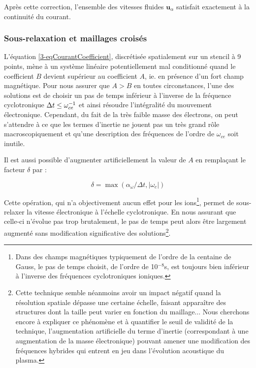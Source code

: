 \begin{refsection}
Après cette correction, l'ensemble des vitesses fluides $\mathbf u_\alpha$
satisfait exactement à la continuité du courant. 

\subsubsection{Sous-relaxation et maillages croisés}
L'équation \eqref{3-eqCourantCoefficient}, discrétisée spatialement sur un
stencil à 9 points, mène à un système linéaire potentiellement mal conditionné
quand le coefficient $B$ devient supérieur au coefficient $A$, ie. en présence
d'un fort champ magnétique. Pour nous assurer que $A>B$ en toutes circonstances,
l'une des solutions est de choisir un pas de temps inférieur à l'inverse de la
fréquence cyclotronique $\Delta t\leq\omega_{ce}^{{-1}}$ et
ainsi résoudre l'intégralité du mouvement électronique. Cependant, du fait de la
très faible masse des électrons, on peut s'attendre à ce que les termes
d'inertie ne jouent pas un très grand rôle macroscopiquement et qu'une
description des fréquences de l'ordre de $\omega_{ce}$ soit inutile.

Il est aussi possible d'augmenter artificiellement la valeur de $A$ en
remplaçant le facteur $\delta$ par :

\begin{equation*}
\delta=\max(\alpha_\omega/\Delta t,|\omega_c|)
\end{equation*}

Cette opération, qui n'a objectivement aucun effet pour les
ions\footnote{Dans des champs magnétiques typiquement de l'ordre de la centaine
de Gauss, le pas de temps choisit, de l'ordre de 10$^{-8}$s, est toujours bien
inférieur à l'inverse des fréquences cyclotroniques ioniques.}, permet de
sous-relaxer la vitesse électronique à l'échelle cyclotronique. En nous assurant
que celle-ci n'évolue pas trop brutalement, le pas de temps peut alors être
largement augmenté sans modification significative des solutions\footnote{Cette
technique semble néanmoins avoir un impact négatif quand la résolution spatiale
dépasse une certaine échelle, faisant apparaître des structures dont la taille
peut varier en fonction du maillage... Nous cherchons encore à
expliquer ce phénomène et à quantifier le seuil de validité de la technique,
l'augmentation artificielle du terme d'inertie (correspondant à une augmentation
de la masse électronique) pouvant amener une modification des fréquences
hybrides qui entrent en jeu dans l'évolution acoustique du plasma.}.


\end{refsection}
